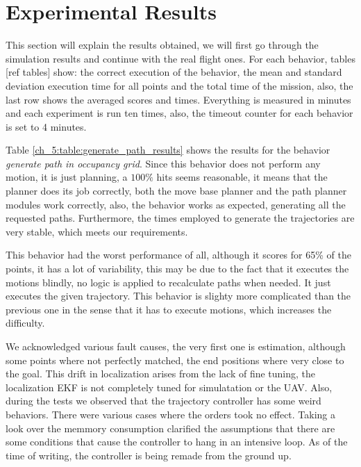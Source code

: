 \section{Experimental Results} \label{ch_5:sect:results}

  This section will explain the results obtained, we will first go through the simulation results and continue with the real flight ones. For each behavior, tables [ref tables] show: the correct execution of the behavior, the mean and standard deviation execution time for all points and the total time of the mission, also, the last row shows the averaged scores and times. Everything is measured in minutes and each experiment is run ten times, also, the timeout counter for each behavior is set to 4 minutes.
 
  

  Table \ref{ch_5:table:generate_path_results} shows the results for the behavior \textit{generate path in occupancy grid}. Since this behavior does not perform any motion, it is just planning, a $100\%$ hits seems reasonable, it means that the planner does its job correctly, both the move base planner and the path planner modules work correctly, also, the behavior works as expected, generating all the requested paths. Furthermore, the times employed to generate the trajectories are very stable, which meets our requirements. 

  

  This behavior had the worst performance of all, although it scores for 65\% of the points, it has a lot of variability, this may be due to the fact that it executes the motions blindly, no logic is applied to recalculate paths when needed. It just executes the given trajectory. This behavior is slighty more complicated than the previous one in the sense that it has to execute motions, which increases the difficulty.

  We acknowledged various fault causes, the very first one is estimation, although some points where not perfectly matched, the end positions where very close to the goal. This drift in localization arises from the lack of fine tuning, the localization EKF is not completely tuned for simulatation or the UAV. Also, during the tests we observed that the trajectory controller has some weird behaviors. There were various cases where the orders took no effect. Taking a look over the memmory consumption clarified the assumptions that there are some conditions that cause the controller to hang in an intensive loop. As of the time of writing, the controller is being remade from the ground up.

